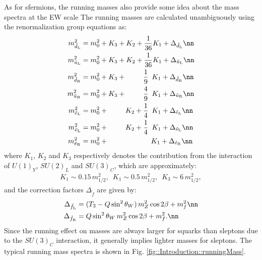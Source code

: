 As for sfermions, the running masses also provide some idea about the mass spectra at the EW scale
The running masses are calculated unambiguously using the renormalization group equations as:
\begin{align}
m_{\tilde{d}_{\mathrm{L}}}^2   & = m_0^2 + K_3                    + K_2                    + \frac{1}{36} K_1 + \Delta_{\tilde{d}_{\mathrm{L}}}   \nn  \\ 
m_{\tilde{u}_{\mathrm{L}}}^2   & = m_0^2 + K_3                    + K_2                    + \frac{1}{36} K_1 + \Delta_{\tilde{u}_{\mathrm{L}}}   \nn  \\ 
m_{\tilde{d}_{\mathrm{R}}}^2   & = m_0^2 + K_3                    + \mbox{\phantom{$K_2$ +}} \frac{1}{9} \,\,\,  K_1 +  \Delta_{\tilde{d}_{\mathrm{R}}}   \nn  \\ 
m_{\tilde{u}_{\mathrm{R}}}^2   & = m_0^2 + K_3                    + \mbox{\phantom{$K_2$ +}} \frac{4}{9} \,\,\,  K_1 +  \Delta_{\tilde{u}_{\mathrm{R}}}   \nn  \\ 
m_{\tilde{e}_{\mathrm{L}}}^2   & = m_0^2 + \mbox{\phantom{$K_3$ +}} K_2                    + \frac{1}{4} \,\,\,  K_1 +  \Delta_{\tilde{e}_{\mathrm{L}}}   \nn  \\ 
m_{\tilde{\nu}_{\mathrm{L}}}^2 & = m_0^2 + \mbox{\phantom{$K_3$ +}} K_2                    + \frac{1}{4} \,\,\,  K_1 +  \Delta_{\tilde{\nu}_{\mathrm{L}}} \nn  \\ 
m_{\tilde{e}_{\mathrm{R}}}^2   & = m_0^2 + \mbox{\phantom{$K_3$ +}} \mbox{\phantom{$K_2$ +}} \mbox{\phantom{kk}}\, K_1 + \Delta_{\tilde{e}_{\mathrm{R}}}   \nn  \\ 
\end{align}
where $K_1$, $K_2$ and $K_3$ respectively denotes the contribution from the interaction of $U(1)_Y$, $SU(2)_L$ and $SU(3)_C$, which are approximately:
\begin{align}
K_1 \sim 0.15 \, m_{1/2}^2, \,\,\, K_1 \sim 0.5 \, m_{1/2}^2, \,\,\, K_3 \sim 6 \, m_{1/2}^2,
\end{align}
and the correction factors $\Delta_{\tilde{f}}$ are given by:
\begin{align}
\Delta_{\tilde{f}_\mathrm{L}} & = (T_3-Q\sin^2{\theta_W}) \, m_Z^2 \cos{2\beta} + m_f^2   \nn \\
\Delta_{\tilde{f}_\mathrm{R}} & = Q\sin^2{\theta_W} \, m_Z^2 \cos{2\beta} + m_f^2.   \nn \\
\end{align}
Since the running effect on masses are always larger for squarks than sleptons due to the $SU(3)_C$ interaction, 
it generally implies lighter masses for sleptons.
The typical running mass spectra is shown in Fig. \ref{fig::Introduction::runningMass}.

